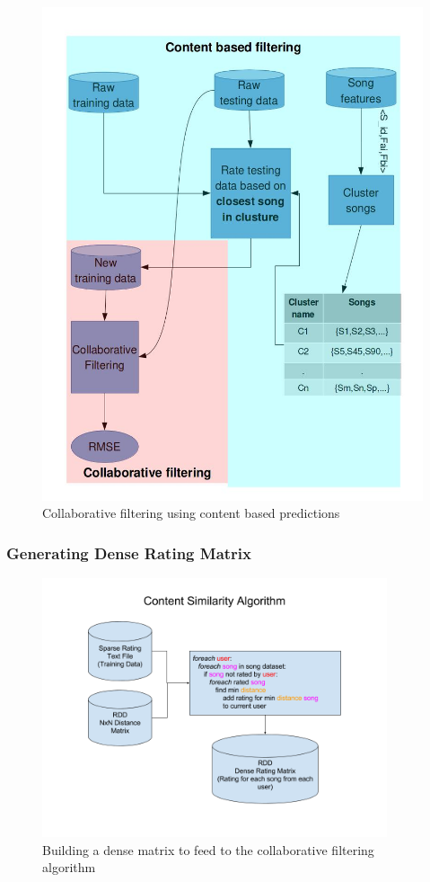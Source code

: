 \documentclass[11pt]{beamer}
\begin{document}
  \begin{frame}
    \begin{figure}[!h]
      \centering
      \includegraphics[width=0.5\linewidth]{figures/contentBasedBlockDiag.jpg}
      \caption{Collaborative filtering using content based predictions}
    \end{figure}
  \end{frame}
  \begin{frame}
    \frametitle{Generating Dense Rating Matrix}
    \begin{figure}[h]
      \centering
      \includegraphics[width=4in]{figures/content_similarity_algorithm.png}
      \caption{Building a dense matrix to feed to the collaborative filtering algorithm}
      \label{fig:content_similarity_algorithm}
    \end{figure}
  \end{frame}
\end{document}
